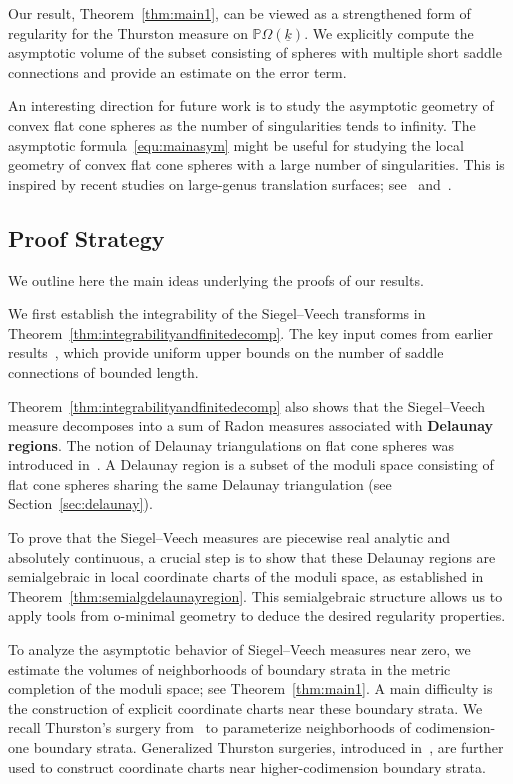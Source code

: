 \documentclass{compositio}
\numberwithin{equation}{section}
\numberwithin{figure}{section}
\theoremstyle{definition}
\theoremstyle{plain}
\begin{document}
{Our result, Theorem~\ref{thm:main1}, can be viewed as a strengthened form of regularity for the Thurston measure on $\mathbb{P}\Omega(\underline{k})$. We explicitly compute the asymptotic volume of the subset consisting of spheres with multiple short saddle connections and provide an estimate on the error term.\newline

An interesting direction for future work is to study the asymptotic geometry of convex flat cone spheres as the number of singularities tends to infinity. The asymptotic formula~\eqref{equ:mainasym} might be useful for studying the local geometry of convex flat cone spheres with a large number of singularities. This is inspired by recent studies on large-genus translation surfaces; see~\cite{masur2024lengthssaddleconnectionsrandom} and~\cite{bowen2025benjaminischrammlimitshighgenus}.


\subsection{Proof Strategy}

We outline here the main ideas underlying the proofs of our results.

We first establish the integrability of the Siegel--Veech transforms in Theorem~\ref{thm:integrabilityandfinitedecomp}. The key input comes from earlier results~\cite{fu2023boundssaddleconnectionsflat,fu2024uniformlengthestimatestrajectories}, which provide uniform upper bounds on the number of saddle connections of bounded length.

Theorem~\ref{thm:integrabilityandfinitedecomp} also shows that the Siegel--Veech measure decomposes into a sum of Radon measures associated with \textbf{Delaunay regions}. The notion of Delaunay triangulations on flat cone spheres was introduced in~\cite{Delaunay, Masur1991, thu}. A Delaunay region is a subset of the moduli space consisting of flat cone spheres sharing the same Delaunay triangulation (see Section~\ref{sec:delaunay}).

To prove that the Siegel--Veech measures are piecewise real analytic and absolutely continuous, a crucial step is to show that these Delaunay regions are semialgebraic in local coordinate charts of the moduli space, as established in Theorem~\ref{thm:semialgdelaunayregion}. This semialgebraic structure allows us to apply tools from o-minimal geometry to deduce the desired regularity properties.

To analyze the asymptotic behavior of Siegel--Veech measures near zero, we estimate the volumes of neighborhoods of boundary strata in the metric completion of the moduli space; see Theorem~\ref{thm:main1}. A main difficulty is the construction of explicit coordinate charts near these boundary strata. We recall Thurston’s surgery from~\cite{thu} to parameterize neighborhoods of codimension-one boundary strata. Generalized Thurston surgeries, introduced in~\cite{fu2024uniformlengthestimatestrajectories}, are further used to construct coordinate charts near higher-codimension boundary strata.

}
\end{document}
